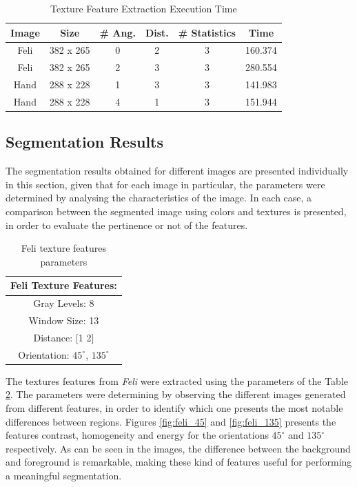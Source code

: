 \documentclass{IEEEtran}
\begin{document}
\begin{table}[h!]
\centering
\begin{tabular}{|c|c|c|c|c|c|}
\hline
Image & Size &\# Ang. & Dist. & \# Statistics & Time \\  
\hline
Feli & 382 x 265 & 0 & 2 & 3 & 160.374 \\
\hline
Feli & 382 x 265  & 2 & 3 & 3 & 280.554 \\
\hline
Hand & 288 x 228 & 1 & 3 & 3 & 141.983 \\
\hline
Hand & 288 x 228 & 4 & 1 & 3 & 151.944\\
\hline
\end{tabular}
\caption{Texture Feature Extraction Execution Time}
\label{tb:performance}
\end{table} 

\subsection{Segmentation Results}

The segmentation results obtained for different images are presented individually in this section, given that for each image in particular, the parameters were determined by analysing the characteristics of the image. In each case, a comparison between the segmented image using colors and textures is presented, in order to evaluate the pertinence or not of the features.\\

\begin{table}[h!] 
\centering
\begin{tabular}{|c|}
\hline
Feli Texture Features:\\
\hline
  Gray Levels:   8\\
  Window Size: 13\\
  Distance:   [1 2]\\
  Orientation:  $45^{\circ}$, $135^{\circ}$\\
\hline
\end{tabular}
\caption{Feli texture features parameters}
\label{tb:param_feli}
\end{table}

The textures features from \textit{Feli} were extracted using the parameters of the Table \ref{tb:param_feli}. The parameters were determining by observing the different images generated from different features, in order to identify which one presents the most notable differences between regions. Figures \ref{fig:feli_45} and \ref{fig:feli_135} presents the features contrast, homogeneity and energy for the orientations $45^{\circ}$ and $135^{\circ}$ respectively. As can be seen in the images, the difference between the background and foreground is remarkable, making these kind of features useful for performing a meaningful segmentation.\\
\end{document}
